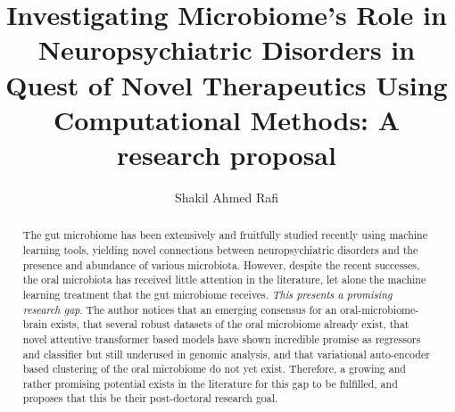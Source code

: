 \documentclass{article}
\title{Investigating Microbiome's Role in Neuropsychiatric Disorders in Quest of Novel Therapeutics Using Computational Methods: A research proposal}
\author{Shakil Ahmed Rafi}
\begin{document}
\maketitle
\begin{abstract}
	The gut microbiome has been extensively and fruitfully studied recently using machine learning tools, yielding novel connections between neuropsychiatric disorders and the presence and abundance of various microbiota. However, despite the recent successes, the oral microbiota has received little attention in the literature, let alone the machine learning treatment that the gut microbiome receives. \textit{This presents a promising research gap}. The author notices that an emerging consensus for an oral-microbiome-brain exists, that several robust datasets of the oral microbiome already exist, that novel attentive transformer based models  have shown incredible promise as regressors and classifier but still underused in genomic analysis, and that variational auto-encoder based clustering of the oral microbiome do not yet exist. Therefore, a growing and rather promising potential exists in the literature for this gap to be fulfilled, and proposes that this be their post-doctoral research goal.
\end{abstract}
\noindent
\end{document}
